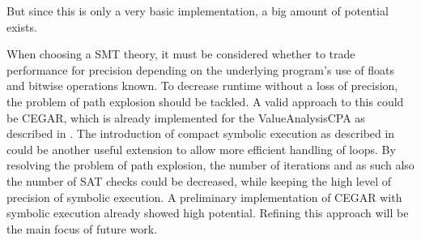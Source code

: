 But since this is only a very basic implementation, a big amount of potential exists.

When choosing a SMT theory,
it must be considered whether to trade performance for precision depending on the underlying program's use of floats and bitwise operations known.
To decrease runtime without a loss of precision, the problem of path explosion should be tackled.
A valid approach to this could be CEGAR, which is already implemented for the ValueAnalysisCPA as described in \cite{Beyer2013}.
The introduction of compact symbolic execution as described in \cite{Slaby2013} could be another useful extension to allow more efficient handling of loops.
By resolving the problem of path explosion, the number of iterations and as such also the number of SAT checks could be decreased, while keeping the high level of precision of symbolic execution.
A preliminary implementation of CEGAR with symbolic execution already showed high potential.
Refining this approach will be the main focus of future work.
